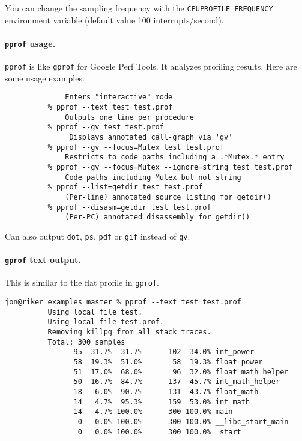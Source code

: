 You can change the sampling frequency with the {\tt CPUPROFILE\_FREQUENCY} environment variable
(default value 100 interrupts/second).

\paragraph{{\tt pprof} usage.} {\tt pprof} is like {\tt gprof} for Google Perf Tools. It
analyzes profiling results. Here are some usage examples.
  \begin{lstlisting}[basicstyle=\tiny]
          % pprof test test.prof
              Enters "interactive" mode
          % pprof --text test test.prof
              Outputs one line per procedure
          % pprof --gv test test.prof
               Displays annotated call-graph via 'gv'
          % pprof --gv --focus=Mutex test test.prof
              Restricts to code paths including a .*Mutex.* entry
          % pprof --gv --focus=Mutex --ignore=string test test.prof
              Code paths including Mutex but not string
          % pprof --list=getdir test test.prof
              (Per-line) annotated source listing for getdir()
          % pprof --disasm=getdir test test.prof
              (Per-PC) annotated disassembly for getdir()
  \end{lstlisting}

Can also output {\tt dot}, {\tt ps}, {\tt pdf} or {\tt gif} instead of {\tt gv}.

\paragraph{{\tt gprof} text output.}
This is similar to the flat profile in {\tt gprof}.

  \begin{lstlisting}[basicstyle=\tiny]
          jon@riker examples master % pprof --text test test.prof 
          Using local file test.
          Using local file test.prof.
          Removing killpg from all stack traces.
          Total: 300 samples
                95  31.7%  31.7%      102  34.0% int_power
                58  19.3%  51.0%       58  19.3% float_power
                51  17.0%  68.0%       96  32.0% float_math_helper
                50  16.7%  84.7%      137  45.7% int_math_helper
                18   6.0%  90.7%      131  43.7% float_math
                14   4.7%  95.3%      159  53.0% int_math
                14   4.7% 100.0%      300 100.0% main
                 0   0.0% 100.0%      300 100.0% __libc_start_main
                 0   0.0% 100.0%      300 100.0% _start
  \end{lstlisting}

